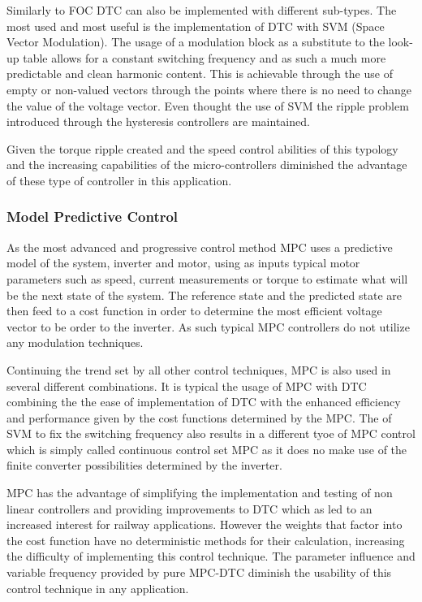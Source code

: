 Similarly to FOC DTC can also be implemented with different sub-types. The most used and most useful is the implementation of DTC with SVM (Space Vector Modulation). The usage of a modulation block as a substitute to the look-up table allows for a constant switching frequency and as such a much more predictable and  clean harmonic content. This is achievable through the use of empty or non-valued vectors through the points where there is no need to change the value of the voltage vector. Even thought the use of SVM the ripple problem introduced through the hysteresis controllers are maintained. 

Given the torque ripple created and the speed control abilities of this typology and the increasing capabilities of the micro-controllers diminished the advantage of these type of controller in this application.


\subsubsection{Model Predictive Control}

As the most advanced and progressive control method MPC uses a predictive model of the system, inverter and motor, using as inputs typical motor parameters such as speed, current measurements or torque to estimate what will be the next state of the system. The reference state and the predicted state are then feed to a cost function in order to determine the most efficient voltage vector to be order to the inverter. As such typical MPC controllers do not utilize any modulation techniques. 

Continuing the trend set by all other control techniques, MPC is also used in several different combinations. It is typical the usage of MPC with DTC combining the the ease of implementation of DTC with the enhanced efficiency and performance given by the cost functions determined by the MPC. The of SVM to fix the switching frequency also results in a different tyoe of MPC control which is simply called continuous control set MPC as it does no make use of the finite converter possibilities determined by the inverter. 

MPC has the advantage of simplifying the implementation and testing of non linear controllers and providing improvements to DTC which as led to an increased interest for railway applications. However the weights that factor into the cost function have no deterministic methods for their calculation, increasing the difficulty of implementing this control technique. The parameter influence and variable frequency provided by pure MPC-DTC diminish the usability of this control technique in any application.

